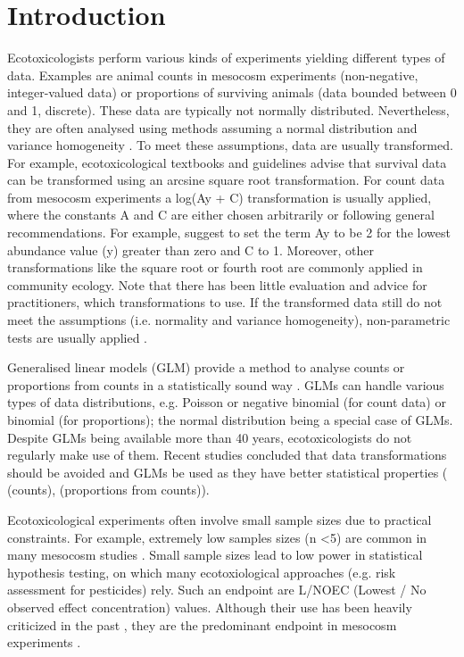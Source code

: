 \documentclass[twocolumn, natbib]{svjour3}
\begin{document}
\section{Introduction}
\label{sec:intro}
Ecotoxicologists perform various kinds of experiments yielding different types of data.
Examples are animal counts in mesocosm experiments (non-negative, integer-valued data) or proportions of surviving animals (data bounded between 0 and 1, discrete).
These data are typically not normally distributed. 
Nevertheless, they are often analysed using methods assuming a normal distribution and variance homogeneity \citep{wang_making_2011}. 
To meet these assumptions, data are usually transformed.
For example, ecotoxicological textbooks \citep{newman_quantitative_2012} and guidelines \citep{epa_methods_2002,oecd_current_2006} advise that survival data can be transformed using an arcsine square root transformation. 
For count data from mesocosm experiments a log(Ay + C) transformation is usually applied, where the constants A and C are either chosen arbitrarily or following general recommendations. 
For example, \citet{van_den_brink_impact_2000} suggest to set the term Ay to be 2 for the lowest abundance value (y) greater than zero and C to 1. 
Moreover, other transformations like the square root or fourth root are commonly applied in community ecology.
Note that there has been little evaluation and advice for practitioners, which transformations to use.
If the transformed data still do not meet the assumptions (i.e. normality and variance homogeneity), non-parametric tests are usually applied \citep{wang_making_2011}.

Generalised linear models (GLM) provide a method to analyse counts or proportions from counts in a  statistically sound way \citep{nelder_generalized_1972}.
GLMs can handle various types of data distributions, e.g. Poisson or negative binomial (for count data) or binomial (for proportions); the normal distribution being a special case of GLMs.
Despite GLMs being available more than 40 years, ecotoxicologists do not regularly make use of them.
Recent studies concluded that data transformations should be avoided and GLMs be used as they have better statistical properties (\citealt{ohara_not_2010} (counts), \citealt{warton_arcsine_2011,warton_many_2005} (proportions from counts)). 

Ecotoxicological experiments often involve small sample sizes due to practical constraints. 
For example, extremely low samples sizes (n \textless 5) are common in many mesocosm studies \citep{sanderson_pesticide_2002,szocs_analysing_2015}.
Small sample sizes lead to low power in statistical hypothesis testing, on which many ecotoxiological approaches (e.g. risk assessment for pesticides) rely. 
Such an endpoint are L/NOEC (Lowest / No observed effect concentration) values.
Although their use has been heavily criticized in the past \citep{laskowski_good_1995}, they are the predominant endpoint in mesocosm experiments \citep{brock_minimum_2015, efsa_ppr_guidance_2013}. 
\end{document}
